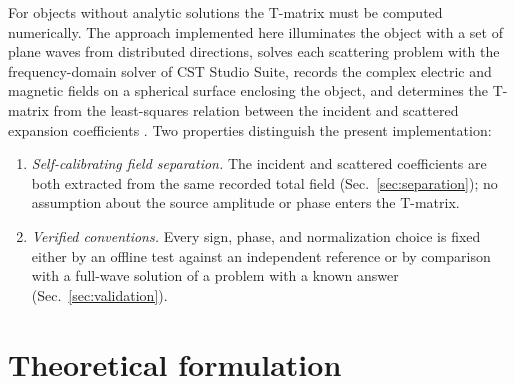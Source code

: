 \documentclass[11pt]{article}
\begin{document}
For objects without analytic solutions the T-matrix must be computed
numerically.  The approach implemented here illuminates the object with a
set of plane waves from distributed directions, solves each scattering
problem with the frequency-domain solver of CST Studio
Suite, records the complex electric and magnetic fields on a spherical
surface enclosing the object, and determines the T-matrix from the
least-squares relation between the incident and scattered expansion
coefficients \cite{Fruhnert2017}.  Two properties distinguish the present
implementation:
\begin{enumerate}
\item \emph{Self-calibrating field separation.}  The incident and
scattered coefficients are both extracted from the same recorded total
field (Sec.~\ref{sec:separation}); no assumption about the source
amplitude or phase enters the T-matrix.
\item \emph{Verified conventions.}  Every sign, phase, and normalization
choice is fixed either by an offline test against an independent
reference or by comparison with a full-wave solution of a problem with a
known answer (Sec.~\ref{sec:validation}).
\end{enumerate}

\section{Theoretical formulation}
\end{document}
